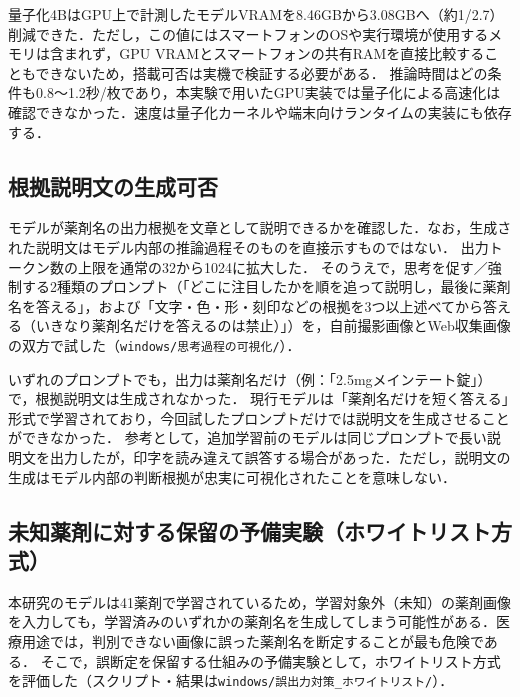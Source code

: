 \documentclass[dvipdfmx]{jsarticle}
\begin{document}
量子化4BはGPU上で計測したモデルVRAMを8.46GBから3.08GBへ（約1/2.7）削減できた．ただし，この値にはスマートフォンのOSや実行環境が使用するメモリは含まれず，GPU VRAMとスマートフォンの共有RAMを直接比較することもできないため，搭載可否は実機で検証する必要がある．
推論時間はどの条件も0.8〜1.2秒/枚であり，本実験で用いたGPU実装では量子化による高速化は確認できなかった．速度は量子化カーネルや端末向けランタイムの実装にも依存する．

\subsection{根拠説明文の生成可否}\label{sec:reasoning}

モデルが薬剤名の出力根拠を文章として説明できるかを確認した．なお，生成された説明文はモデル内部の推論過程そのものを直接示すものではない．
出力トークン数の上限を通常の32から1024に拡大した．
そのうえで，思考を促す／強制する2種類のプロンプト（「どこに注目したかを順を追って説明し，最後に薬剤名を答える」，および「文字・色・形・刻印などの根拠を3つ以上述べてから答える（いきなり薬剤名だけを答えるのは禁止）」）を，自前撮影画像とWeb収集画像の双方で試した（\texttt{windows/思考過程の可視化/}）．

いずれのプロンプトでも，出力は薬剤名だけ（例：「2.5mgメインテート錠」）で，根拠説明文は生成されなかった．
現行モデルは「薬剤名だけを短く答える」形式で学習されており，今回試したプロンプトだけでは説明文を生成させることができなかった．
参考として，追加学習前のモデルは同じプロンプトで長い説明文を出力したが，印字を読み違えて誤答する場合があった．ただし，説明文の生成はモデル内部の判断根拠が忠実に可視化されたことを意味しない．

\subsection{未知薬剤に対する保留の予備実験（ホワイトリスト方式）}\label{sec:unknown}

本研究のモデルは41薬剤で学習されているため，学習対象外（未知）の薬剤画像を入力しても，学習済みのいずれかの薬剤名を生成してしまう可能性がある．医療用途では，判別できない画像に誤った薬剤名を断定することが最も危険である．
そこで，誤断定を保留する仕組みの予備実験として，ホワイトリスト方式を評価した（スクリプト・結果は\texttt{windows/誤出力対策\_ホワイトリスト/}）．
\end{document}
